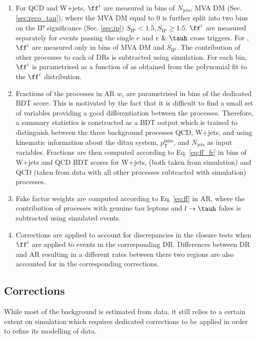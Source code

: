 \begin{enumerate}
    \item For QCD and W+jets, $\ff^i$ are measured in bins of $N_\text{jets}$, MVA DM (Sec. \ref{sec:reco_tau}), where the MVA DM equal to 0 is further split into two bins on the IP significance (Sec. \ref{sec:ip}) $S_{\text{IP}} < 1.5, S_{\text{IP}} \geq 1.5$. $\ff^i$ are measured separately for events passing the single $e$ and $e~\&~\tauh$ cross triggers. For \ttbar, $\ff^i$ are measured only in bins of MVA DM and $S_{\text{IP}}$. The contribution of other processes to each of DRs is subtracted using simulation. For each bin, $\ff^i$ is parametrised as a function of \tauh \pt as obtained from the polynomial fit to the $\ff^i$ distribution. 
    
    \item Fractions of the processes in AR $w_i$ are parametrised in bins of the dedicated BDT score. This is motivated by the fact that it is difficult to find a small set of variables providing a good differentiation between the \jtt processes. Therefore, a summary statistics is constructed as a BDT output which is trained to distinguish between the three background processes QCD, W+jets, and \ttbar using kinematic information about the ditau system, $p_\text{T}^\text{miss}$, and $N_\text{jets}$  as input variables. Fractions are then computed according to Eq. \ref{eq:ff_fr} in bins of W+jets and QCD BDT scores for W+jets, \ttbar (both taken from simulation) and QCD (taken from data with all other processes subtracted with simulation) processes.
    
    \item Fake factor weights are computed according to Eq. \ref{eq:ff} in AR, where the contribution of processes with genuine tau leptons and $l\to\tauh$ fakes is subtracted using simulated events.
    
    \item Corrections are applied to account for discrepancies in the closure tests when $\ff^i$ are applied to events in the corresponding DR. Differences between DR and AR resulting in a different \jtt rates between there two regions are also accounted for in the corresponding corrections. 
\end{enumerate}

\subsection{Corrections}\label{sec:corr}
While most of the background is estimated from data, it still relies to a certain extent on simulation which requires dedicated corrections to be applied in order to refine its modelling of data. 

